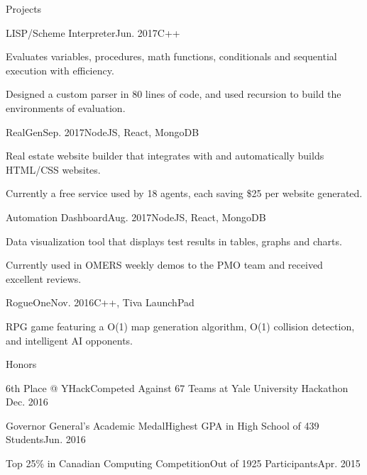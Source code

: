 \documentclass{resume} %
\begin{document}
\begin{rSection}{Projects}

\begin{projSec}{LISP/Scheme Interpreter}{Jun. 2017}{C++ \href{https://github.com/jsun98/SchemePlusPlus}{\space\faGithub}}
\item Evaluates variables, procedures, math functions, conditionals and sequential execution with efficiency.
\item Designed a custom parser in 80 lines of code, and used recursion to build the environments of evaluation.
\end{projSec}

\begin{projSec}{RealGen}{Sep. 2017}{NodeJS, React, MongoDB \href{https://github.com/jsun98/RealGen}{\space\faGithub}}
\item Real estate website builder that integrates with \href{http://www.mls.com/}{\color{gray}{MLS}} and automatically builds HTML/CSS websites.
\item Currently a free service used by 18 agents, each saving \$25 per website generated.
\end{projSec}

\begin{projSec}{Automation Dashboard}{Aug. 2017}{NodeJS, React, MongoDB \href{https://github.com/AutoNinja/automation-dashboard}{\space\faGithub}}
\item Data visualization tool that displays test results in tables, graphs and charts.
\item Currently used in OMERS weekly demos to the PMO team and received excellent reviews.
\end{projSec}

\begin{projSec}{RogueOne}{Nov. 2016}{C++, Tiva LaunchPad \href{https://github.com/jsun98/RogueOne}{\space\faGithub}}
\item RPG game featuring a O(1) map generation algorithm, O(1) collision detection, and intelligent AI opponents.
\end{projSec}

\end{rSection}


\begin{rSection}{Honors}

\begin{honorSec}{6th Place @ YHack}{Competed Against 67 Teams at Yale University Hackathon \href{https://devpost.com/software/yhack_unity_zombies}{\space\small\faExternalLink}}{Dec. 2016}\end{honorSec}
\begin{honorSec}{Governor General's Academic Medal}{Highest GPA in High School of 439 Students}{Jun. 2016}\end{honorSec}
\begin{honorSec}{Top 25\% in Canadian Computing Competition}{Out of 1925 Participants}{Apr. 2015}\end{honorSec}
\vspace{1em} 

\end{rSection}
\end{document}
